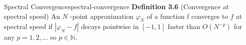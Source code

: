\begin{definition}{Spectral Convergence}{spectral-convergence}
  \textbf{Definition 3.6} (Convergence at spectral speed) An \(N\) -point
  approximation \(\varphi_N\) of a function f converges to \(f\) at
  spectral speed if \(|\varphi_N -f|\) decays pointwise in \([-1, 1]\)
  faster than \(O(N^{-p})\) for any \(p = 1, 2, . . .\) so
  \(p \in \mathbb{N}\).
\end{definition}
